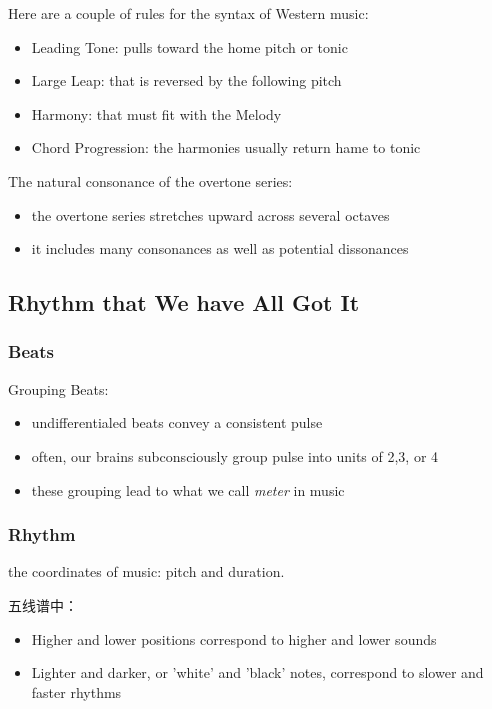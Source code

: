 Here are a couple of rules for the syntax of Western music:
\begin{itemize}
  \item Leading Tone: pulls toward the home pitch or tonic
  \item Large Leap: that is reversed by the following pitch
  \item Harmony: that must fit with the Melody
  \item Chord Progression: the harmonies usually return hame to tonic
\end{itemize}

The natural consonance of the overtone series:
\begin{itemize}
  \item the overtone series stretches upward across several octaves
  \item it includes many consonances as well as potential dissonances
\end{itemize}
\subsection{Rhythm that We have All Got It}
\subsubsection{Beats}
Grouping Beats:
\begin{itemize}
  \item undifferentialed beats convey a consistent pulse
  \item often, our brains subconsciously group pulse into units of 2,3, or 4
  \item these grouping lead to what we call \emph{meter} in music
\end{itemize}
\subsubsection{Rhythm}
the coordinates of music: pitch and duration.


五线谱中：
\begin{itemize}
  \item Higher and lower positions correspond to higher and lower sounds
  \item Lighter and darker, or 'white' and 'black' notes, correspond to 
  slower and faster rhythms
\end{itemize}

